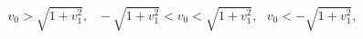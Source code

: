 \begin{equation}\label{regular}
v_0>\sqrt{1+v_1^2},~~~-\sqrt{1+v_1^2}<v_0<\sqrt{1+v_1^2},~~~ 
v_0<-\sqrt{1+v_1^2}, 
\end{equation}


